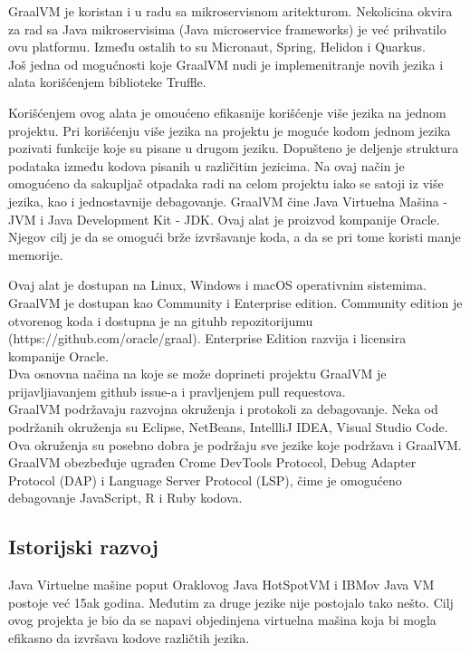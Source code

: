 \documentclass[a4paper]{article}
\begin{document}
GraalVM je koristan i u radu sa mikroservisnom aritekturom. Nekolicina okvira za rad sa Java mikroservisima  (Java microservice frameworks) je već prihvatilo ovu platformu. Između ostalih to su Micronaut, Spring, Helidon i Quarkus. \\

Još jedna od mogućnosti koje GraalVM nudi je implemenitranje novih jezika i alata korišćenjem biblioteke Truffle.

Korišćenjem ovog alata je omoućeno efikasnije korišćenje više jezika na jednom projektu. Pri korišćenju više jezika na projektu je moguće kodom jednom jezika pozivati funkcije koje su pisane u drugom jeziku. Dopušteno je deljenje struktura podataka između kodova pisanih u različitim jezicima. Na ovaj način je omogućeno da sakupljač otpadaka radi na celom projektu iako se satoji iz više jezika, kao i jednostavnije debagovanje.
GraalVM čine Java Virtuelna Mašina - JVM i Java Development Kit - JDK. Ovaj alat je proizvod kompanije Oracle. Njegov cilj je da se omogući brže izvršavanje koda, a da se pri tome koristi manje memorije.

Ovaj alat je dostupan na Linux, Windows i macOS operativnim sistemima. \\

GraalVM je dostupan kao Community i Enterprise edition. Community edition je otvorenog koda i dostupna je na gituhb repozitorijumu (https://github.com/oracle/graal). Enterprise Edition razvija i licensira kompanije Oracle. \\
Dva osnovna načina na koje se može doprineti projektu GraalVM je prijavljiavanjem github issue-a i pravljenjem pull requestova. \\

GraalVM podržavaju razvojna okruženja i protokoli za debagovanje. Neka od podržanih okruženja su Eclipse, NetBeans, IntellliJ IDEA, Visual Studio Code. Ova okruženja su posebno dobra je podržaju sve jezike koje podržava i GraalVM. GraalVM obezbeđuje ugrađen Crome DevTools Protocol, Debug Adapter Protocol (DAP) i Language Server Protocol (LSP), čime je omogućeno debagovanje JavaScript, R i Ruby kodova.

\subsection{Istorijski razvoj}
\label{subsec:Istorijski razvoj}

Java Virtuelne mašine poput Oraklovog Java HotSpotVM i IBMov Java VM postoje već 15ak godina. Međutim za druge jezike nije postojalo tako nešto. Cilj ovog projekta je bio da se napavi objedinjena virtuelna mašina koja bi mogla efikasno da izvršava kodove različtih jezika.\\
\end{document}
